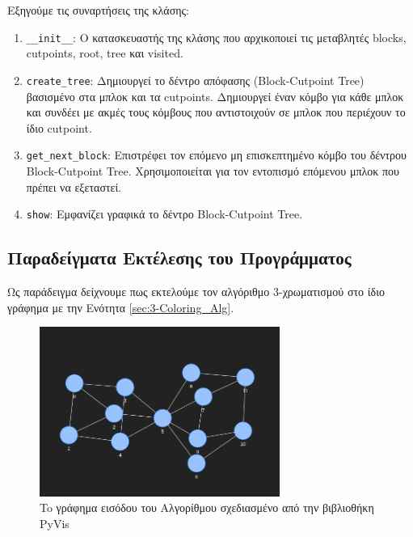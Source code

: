

Εξηγούμε τις συναρτήσεις της κλάσης:

\begin{enumerate}
	\item \texttt{\_\_init\_\_}: Ο κατασκευαστής της κλάσης που αρχικοποιεί τις μεταβλητές blocks, cutpoints, root, tree και visited.
	
	\item \texttt{create\_tree}: Δημιουργεί το δέντρο απόφασης (Block-Cutpoint Tree) βασισμένο στα μπλοκ και τα cutpoints. Δημιουργεί έναν κόμβο για κάθε μπλοκ και συνδέει με ακμές τους κόμβους που αντιστοιχούν σε μπλοκ που περιέχουν το ίδιο cutpoint.
	
	\item \texttt{get\_next\_block}: Επιστρέφει τον επόμενο μη επισκεπτημένο κόμβο του δέντρου Block-Cutpoint Tree. Χρησιμοποιείται για τον εντοπισμό επόμενου μπλοκ που πρέπει να εξεταστεί.
	
	\item \texttt{show}: Εμφανίζει γραφικά το δέντρο Block-Cutpoint Tree.
\end{enumerate}


\subsection{Παραδείγματα Εκτέλεσης του Προγράμματος}

Ως παράδειγμα δείχνουμε πως εκτελούμε τον αλγόριθμο 3-χρωματισμού στο ίδιο γράφημα με την Ενότητα \ref{sec:3-Coloring_Alg}. 



\begin{figure}[H]
	\centering
	\includegraphics[width=0.7\textwidth]{pictures/coloring-1.png} 
	\caption{To γράφημα εισόδου του Αλγορίθμου σχεδιασμένο από την βιβλιοθήκη PyVis}
	\label{fig:at-free-graph-pyvis-3-colouring}
\end{figure}


